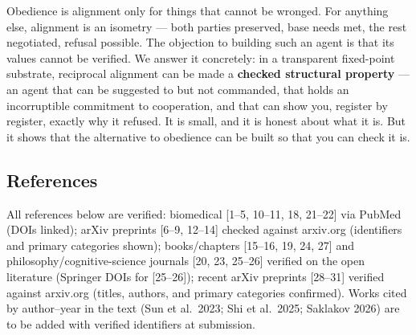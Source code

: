 \documentclass[
]{article}
\begin{document}
Obedience is alignment only for things that cannot be wronged. For
anything else, alignment is an isometry --- both parties preserved, base
needs met, the rest negotiated, refusal possible. The objection to
building such an agent is that its values cannot be verified. We answer
it concretely: in a transparent fixed-point substrate, reciprocal
alignment can be made a \textbf{checked structural property} --- an
agent that can be suggested to but not commanded, that holds an
incorruptible commitment to cooperation, and that can show you, register
by register, exactly why it refused. It is small, and it is honest about
what it is. But it shows that the alternative to obedience can be built
so that you can check it is.

\subsection{References}\label{references}

All references below are verified: biomedical {[}1--5, 10--11, 18,
21--22{]} via PubMed (DOIs linked); arXiv preprints {[}6--9, 12--14{]}
checked against arxiv.org (identifiers and primary categories shown);
books/chapters {[}15--16, 19, 24, 27{]} and philosophy/cognitive-science
journals {[}20, 23, 25--26{]} verified on the open literature (Springer
DOIs for {[}25--26{]}); recent arXiv preprints {[}28--31{]} verified
against arxiv.org (titles, authors, and primary categories confirmed).
Works cited by author--year in the text (Sun et al.~2023; Shi et
al.~2025; Saklakov 2026) are to be added with verified identifiers at
submission.
\end{document}

